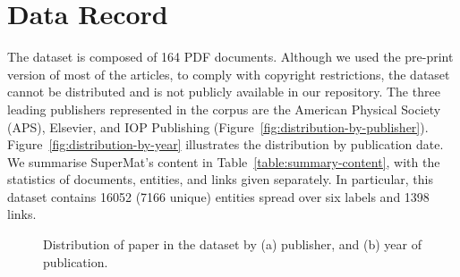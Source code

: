 \section{Data Record}
\label{sec:data-record}
The dataset is composed of 164 PDF documents. Although we used the pre-print version of most of the articles, to comply with copyright restrictions, the dataset cannot be distributed and is not publicly available in our repository. 
The three leading publishers represented in the corpus are the American Physical Society (APS), Elsevier, and IOP Publishing (Figure~\ref{fig:distribution-by-publisher}).
Figure~\ref{fig:distribution-by-year} illustrates the distribution by publication date.
We summarise SuperMat's content in Table~\ref{table:summary-content}, with the statistics of documents, entities, and links given separately. In particular, this dataset contains 16052 (7166 unique) entities spread over six labels and 1398 links. 

\begin{figure}[htbp]
\centering
{} 
\hspace{5pt} 
\caption{Distribution of paper in the dataset by (a) publisher, and (b) year of publication.} 
\label{fig:dataset-distributions}
\end{figure}

